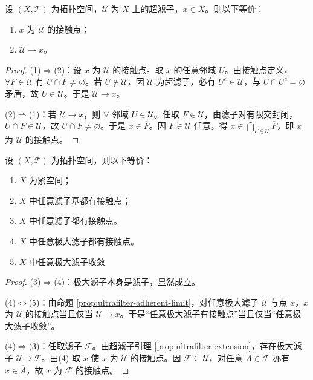 \documentclass[lang=cn,a4paper,newtx,figureplace=section,tableplace=section]{elegantbook}
\begin{document}
  \begin{proposition}[超滤子的接触点与收敛]\label{prop:ultrafilter-adherent-limit}
  设 $(X,\mathcal T)$ 为拓扑空间，$\mathcal U$ 为 $X$ 上的超滤子，$x\in X$。则以下等价：
  \begin{enumerate}
    \item $x$ 为 $\mathcal U$ 的接触点；
    \item $\mathcal U\to x$。
  \end{enumerate}
  \end{proposition}
  \begin{proof}
  (1)$\Rightarrow$(2)：设 $x$ 为 $\mathcal U$ 的接触点。取 $x$ 的任意邻域 $U$。由接触点定义，$\forall F\in\mathcal U$ 有 $U\cap F\ne\varnothing$。若 $U\notin\mathcal U$，因 $\mathcal U$ 为超滤子，必有 $U^c\in\mathcal U$，与 $U\cap U^c=\varnothing$ 矛盾，故 $U\in\mathcal U$。于是 $\mathcal U\to x$。
  
  (2)$\Rightarrow$(1)：若 $\mathcal U\to x$，则 $\forall$ 邻域 $U\in\mathcal U$。任取 $F\in\mathcal U$，由滤子对有限交封闭，$U\cap F\in\mathcal U$，故 $U\cap F\ne\varnothing$。于是 $x\in\overline{F}$。因 $F\in\mathcal U$ 任意，得 $x\in\bigcap_{F\in\mathcal U}\overline{F}$，即 $x$ 为 $\mathcal U$ 的接触点。
  \end{proof}
  \begin{proposition}\label{prop:compact-filter-cluster1}
  设 $(X,\mathcal T)$ 为拓扑空间，则以下等价：
  \begin{enumerate}
    \item $X$ 为紧空间；
    \item $X$ 中任意滤子基都有接触点；
    \item $X$ 中任意滤子都有接触点。
    \item $X$ 中任意极大滤子都有接触点。
    \item $X$ 中任意极大滤子收敛
  \end{enumerate}
  \end{proposition}
  \begin{proof}
  (3)$\Rightarrow$(4)：极大滤子本身是滤子，显然成立。
  
  (4)$\Leftrightarrow$(5)：由命题 \ref{prop:ultrafilter-adherent-limit}，对任意极大滤子 $\mathcal U$ 与点 $x$，$x$ 为 $\mathcal U$ 的接触点当且仅当 $\mathcal U\to x$。于是“任意极大滤子有接触点”当且仅当“任意极大滤子收敛”。
  
  (4)$\Rightarrow$(3)：任取滤子 $\mathcal F$。由超滤子引理 \ref{prop:ultrafilter-extension}，存在极大滤子 $\mathcal U\supseteq\mathcal F$。由(4) 取 $x$ 使 $x$ 为 $\mathcal U$ 的接触点。因 $\mathcal F\subseteq\mathcal U$，对任意 $A\in\mathcal F$ 亦有 $x\in\overline{A}$，故 $x$ 为 $\mathcal F$ 的接触点。
  
  \end{proof}
  
\end{document}
